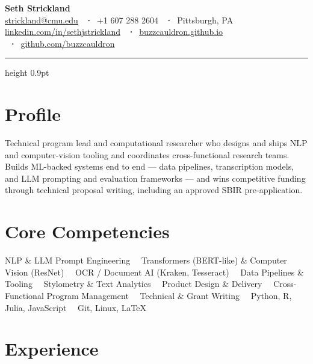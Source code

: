\documentclass[11pt,letterpaper]{article}
\begin{document}
{\Huge\bfseries\color{accent} Seth Strickland}\\[5pt]
{\small
  \href{mailto:strickland@cmu.edu}{strickland@cmu.edu} \ \textbf{·}\
  +1 607 288 2604 \ \textbf{·}\ Pittsburgh, PA\\[2pt]
  \href{https://linkedin.com/in/sethjstrickland}{linkedin.com/in/sethjstrickland} \ \textbf{·}\
  \href{https://buzzcauldron.github.io}{buzzcauldron.github.io} \ \textbf{·}\
  \href{https://github.com/buzzcauldron}{github.com/buzzcauldron}
}\\[4pt]
{\color{rulecol}\hrule height 0.9pt}
\vspace{4pt}

\section{Profile}
Technical program lead and computational researcher who designs and ships NLP and computer-vision
tooling and coordinates cross-functional research teams. Builds ML-backed systems end to end ---
data pipelines, transcription models, and LLM prompting and evaluation frameworks --- and wins
competitive funding through technical proposal writing, including an approved SBIR pre-application.

\section{Core Competencies}
NLP \& LLM Prompt Engineering \ \textbullet\ Transformers (BERT-like) \& Computer Vision (ResNet)
\ \textbullet\ OCR / Document AI (Kraken, Tesseract) \ \textbullet\ Data Pipelines \& Tooling
\ \textbullet\ Stylometry \& Text Analytics \ \textbullet\ Product Design \& Delivery
\ \textbullet\ Cross-Functional Program Management \ \textbullet\ Technical \& Grant Writing
\ \textbullet\ Python, R, Julia, JavaScript \ \textbullet\ Git, Linux, LaTeX

\section{Experience}
\end{document}
